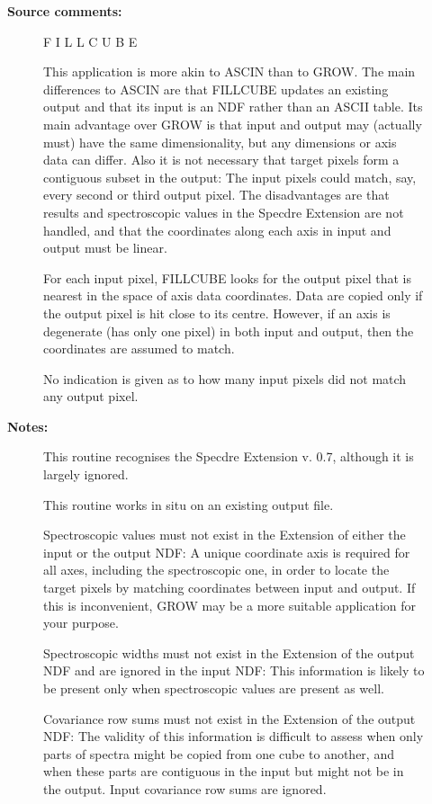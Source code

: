 \begin{description}
\begin{description}
\begin{description}
\end{description}

\item [\textbf{Source comments:}]
\begin{terminalv}
   F I L L C U B E

   This application is more akin to ASCIN than to GROW. The main
   differences to ASCIN are that FILLCUBE updates an existing output
   and that its input is an NDF rather than an ASCII table.
   Its main advantage over GROW is that input and output may
   (actually must) have the same dimensionality, but any dimensions
   or axis data can differ. Also it is not necessary that target
   pixels form a contiguous subset in the output: The input pixels
   could match, say, every second or third output pixel.
   The disadvantages are that results and spectroscopic values in the
   Specdre Extension are not handled, and that the coordinates along
   each axis in input and output must be linear.

   For each input pixel, FILLCUBE looks for the output pixel that is
   nearest in the space of axis data coordinates. Data are copied
   only if the output pixel is hit close to its centre. However, if
   an axis is degenerate (has only one pixel) in both input and
   output, then the coordinates are assumed to match.

   No indication is given as to how many input pixels did not match
   any output pixel.
\end{terminalv}

\item [\textbf{Notes:}]
This routine recognises the Specdre Extension v. 0.7, although
it is largely ignored.

This routine works in situ on an existing output file.

Spectroscopic values must not exist in the Extension of either
the input or the output NDF: A unique coordinate axis is
required for all axes, including the spectroscopic one, in
order to locate the target pixels by matching coordinates
between input and output. If this is inconvenient, GROW may be
a more suitable application for your purpose.

Spectroscopic widths must not exist in the Extension of the
output NDF and are ignored in the input NDF: This information
is likely to be present only when spectroscopic values are
present as well.

Covariance row sums must not exist in the Extension of the
output NDF: The validity of this information is difficult to
assess when only parts of spectra might be copied from one cube
to another, and when these parts are contiguous in the input
but might not be in the output. Input covariance row sums are
ignored.


\end{description}
\end{description}
